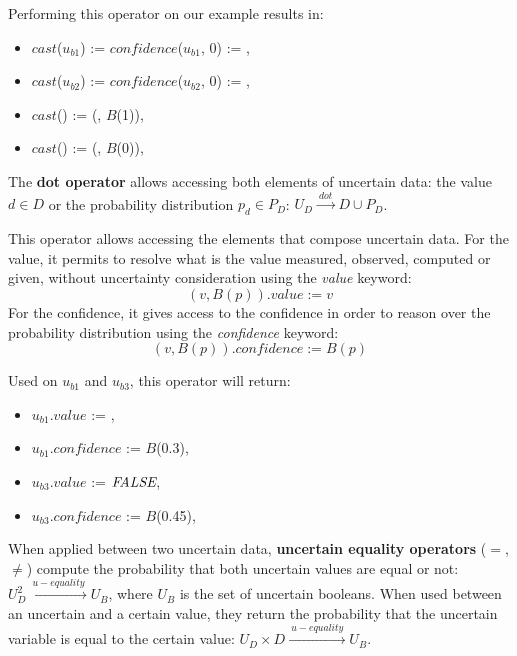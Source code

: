 Performing this operator on our example results in:
\begin{itemize}
    \item $cast$($u_{b1}$) := $confidence$($u_{b1}$, 0) := \false{},
    \item $cast$($u_{b2}$) := $confidence$($u_{b2}$, 0) := \true{},
    \item $cast$(\true{}) := (\true{}, $B$(1)),
    \item $cast$(\false{}) := (\false{}, $B$(0)),
\end{itemize}            			
		
\begin{operator}
    \label{op:dot}
    The \textbf{dot operator} allows accessing both elements of uncertain data: the value $d \in D$ or the probability distribution $p_d \in P_D$: $U_D \xrightarrow{~dot~} D \cup P_D$.
\end{operator}

This operator allows accessing the elements that compose uncertain data.
For the value, it permits to resolve what is the value measured, observed, computed or given, without uncertainty consideration using the \textit{value} keyword:
\[(v, B(p)).value := v\]
For the confidence, it gives access to the confidence in order to reason over the probability distribution using the \textit{confidence} keyword:
\[(v, B(p)).confidence := B(p)\]

Used on $u_{b1}$ and $u_{b3}$, this operator will return:
\begin{itemize}
    \item $u_{b1}$.$value$ := \true{},
    \item  $u_{b1}$.$confidence$ := $B$(0.3),
    \item $u_{b3}$.$value$ := $\textit{FALSE}{}$,
    \item $u_{b3}$.$confidence$ := $B$(0.45),
\end{itemize}

\begin{operator}
	\label{op:u-equality}
	When applied between two uncertain data, \textbf{uncertain equality operators} ($=$, $\neq$) compute the probability that both uncertain values are equal or not: $U_D^2 \xrightarrow{~u-equality~} U_B$, where $U_B$ is the set of uncertain booleans.
	When used between an uncertain and a certain value, they return the probability that the uncertain variable is equal to the certain value: $U_D \times D \xrightarrow{~u-equality~} U_B$.
\end{operator}

